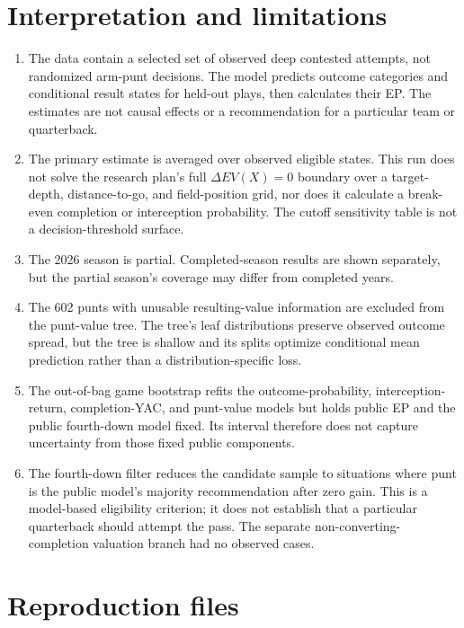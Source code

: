 \documentclass[11pt]{article}
\begin{document}
\section{Interpretation and limitations}

\begin{enumerate}[leftmargin=*]
  \item The data contain a selected set of observed deep contested attempts, not randomized arm-punt decisions. The model predicts outcome categories and conditional result states for held-out plays, then calculates their EP. The estimates are not causal effects or a recommendation for a particular team or quarterback.
  \item The primary estimate is averaged over observed eligible states. This run does not solve the research plan's full \(\Delta EV(X)=0\) boundary over a target-depth, distance-to-go, and field-position grid, nor does it calculate a break-even completion or interception probability. The cutoff sensitivity table is not a decision-threshold surface.
  \item The 2026 season is partial. Completed-season results are shown separately, but the partial season's coverage may differ from completed years.
  \item The 602 punts with unusable resulting-value information are excluded from the punt-value tree. The tree's leaf distributions preserve observed outcome spread, but the tree is shallow and its splits optimize conditional mean prediction rather than a distribution-specific loss.
  \item The out-of-bag game bootstrap refits the outcome-probability, interception-return, completion-YAC, and punt-value models but holds public EP and the public fourth-down model fixed. Its interval therefore does not capture uncertainty from those fixed public components.
  \item The fourth-down filter reduces the candidate sample to situations where punt is the public model's majority recommendation after zero gain. This is a model-based eligibility criterion; it does not establish that a particular quarterback should attempt the pass. The separate non-converting-completion valuation branch had no observed cases.
\end{enumerate}

\section{Reproduction files}
\end{document}
